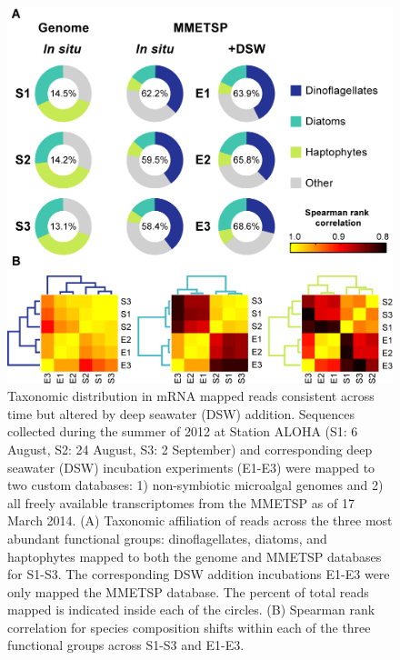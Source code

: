 \begin{figure}[p!]
  \centering
    \includegraphics[width=.8\textwidth]{Images/C4_Figure1_Final.png}
    \caption[Taxonomic distribution in mRNA mapped reads consistent across time but altered by deep seawater (DSW) addition]{Taxonomic distribution in mRNA mapped reads consistent across time but altered by deep seawater (DSW) addition. Sequences collected during the summer of 2012 at Station ALOHA (S1: 6 August, S2: 24 August, S3: 2 September) and corresponding deep seawater (DSW) incubation experiments (E1-E3) were mapped to two custom databases: 1) non-symbiotic microalgal genomes and 2) all freely available transcriptomes from the MMETSP as of 17 March 2014. (A) Taxonomic affiliation of reads across the three most abundant functional groups: dinoflagellates, diatoms, and haptophytes mapped to both the genome and MMETSP databases for S1-S3. The corresponding DSW addition incubations E1-E3 were only mapped the MMETSP database. The percent of total reads mapped is indicated inside each of the circles. (B) Spearman rank correlation for species composition shifts within each of the three functional groups across S1-S3 and E1-E3.}
  \label{fig:c4f1}
\end{figure}


